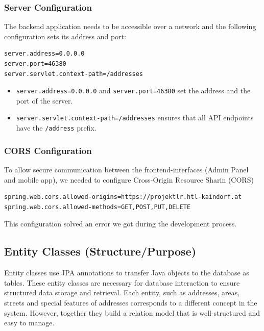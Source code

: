         \subsubsection{Server Configuration}
        The backend application needs to be accessible over a network and the following configuration sets its address and port:
        \lstset{style=mycsharp, caption=Server Configuration}
        \begin{lstlisting}
server.address=0.0.0.0
server.port=46380
server.servlet.context-path=/addresses            
        \end{lstlisting} 
        \begin{itemize}
            \item \texttt{server.address=0.0.0.0} and \texttt{server.port=46380} set the address and the port of the server.
            \item \texttt{server.servlet.context-path=/addresses} ensures that all API endpoints have the \texttt{/address} prefix.
        \end{itemize}

        \subsubsection{CORS Configuration}
        To allow secure communication between the frontend-interfaces (Admin Panel and mobile app), we needed to configure Cross-Origin Resource Sharin (CORS)
        \lstset{style=mycsharp, caption=CORS Configuration}
        \begin{lstlisting}
spring.web.cors.allowed-origins=https://projektlr.htl-kaindorf.at
spring.web.cors.allowed-methods=GET,POST,PUT,DELETE                      
        \end{lstlisting} 
        This configuration solved an error we got during the development process.

    \subsection{Entity Classes (Structure/Purpose)}
    Entity classes use JPA annotations to transfer Java objects to the database as tables. These entity classes are necessary for database interaction to ensure structured data storage and retrieval. \newline
    Each entity, such as addresses, areas, streets and special features of addresses corresponds to a different concept in the system. However, together they build a relation model that is well-structured and easy to manage. \newline


